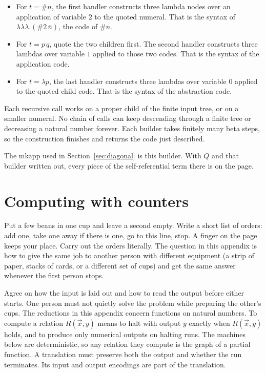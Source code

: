 \documentclass[11pt,twoside]{article}
\theoremstyle{thielethm}
\theoremstyle{thieledef}
\theoremstyle{thieledef}
\theoremstyle{thieledef}
\theoremstyle{thielethm}
\theoremstyle{thieleobs}
\theoremstyle{thielethm}
\begin{document}
\begin{itemize}
\item For $t=\#n$, the first handler constructs three lambda nodes over an application
of variable $2$ to the quoted numeral. That is the syntax of
$\lambda\lambda\lambda.(\#2\,\overline n)$, the code of $\#n$.
\item For $t=p\,q$, quote the two children first. The second handler
constructs three lambdas over variable $1$ applied to those two codes. That is
the syntax of the application code.
\item For $t=\lambda p$, the last handler constructs three lambdas over variable $0$
applied to the quoted child code. That is the syntax of the abstraction code.
\end{itemize}

Each recursive call works on a proper child of the finite input tree, or on a
smaller numeral. No chain of calls can keep descending through a finite tree
or decreasing a natural number forever. Each builder takes finitely many beta
steps, so the construction finishes and returns the code just described.

The $\mathrm{mkapp}$ used in Section~\ref{sec:diagonal} is this builder. With $Q$ and that
builder written out, every piece of the self-referential term there is on the page.


\section{Computing with counters}

Put a few beans in one cup and leave a second empty. Write a short list of orders:
add one, take one away if there is one, go to this line, stop. A finger on the page
keeps your place. Carry out the orders literally. The question in this appendix
is how to give the same job to another person with different equipment (a strip
of paper, stacks of cards, or a different set of cups) and get the same answer
whenever the first person stops.

Agree on how the input is laid out and how to read the output before either starts.
One person must not quietly solve the problem while preparing the other's cups.
The reductions in this appendix concern functions on natural numbers. To compute a
relation $R(\vec x,y)$ means to halt with output $y$ exactly when $R(\vec x,y)$ holds,
and to produce only numerical outputs on halting runs. The machines below are
deterministic, so any relation they compute is the graph of a partial function.
A translation must preserve both the output and whether the run terminates.
Its input and output encodings are part of the translation.
\end{document}

